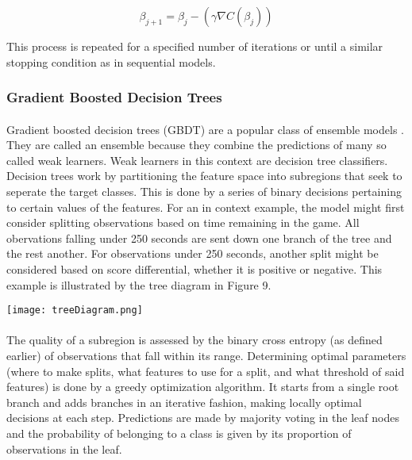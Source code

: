 \documentclass[11pt]{article}
\newenvironment{Figure}
  {\par\medskip\noindent\minipage{\linewidth}}
  {\endminipage\par\medskip}
\begin{document}
\begin{multicols*}{2}
                    $$\beta_{j+1} = \beta_j - (\gamma \nabla C(\beta_j))$$

                    This process is repeated for a specified number of iterations or until a similar stopping condition as in sequential models. 

            \subsubsection*{Gradient Boosted Decision Trees}
                \paragraph{}
                    Gradient boosted decision trees (GBDT) are a popular class of ensemble models \cite{Hastie01}. 
                    They are called an ensemble because they combine the predictions of many so called weak learners. 
                    Weak learners in this context are decision tree classifiers. 
                    Decision trees work by partitioning the feature space into subregions that seek to seperate the target classes.
                    This is done by a series of binary decisions pertaining to certain values of the features. 
                    For an in context example, the model might first consider splitting observations based on time remaining in the game. 
                    All obervations falling under 250 seconds are sent down one branch of the tree and the rest another. 
                    For observations under 250 seconds, another split might be considered based on score differential, whether it is positive or negative.
                    This example is illustrated by the tree diagram in Figure 9.
                    
                    \begin{Figure}  
                        \centering
                        \texttt{[image: treeDiagram.png]}
                        \label{fig:Simple Tree}
                    \end{Figure}

                    
                \paragraph{}
                    The quality of a subregion is assessed by the binary cross entropy (as defined earlier) of observations that fall within its range. 
                    Determining optimal parameters (where to make splits, what features to use for a split, and what threshold of said features) is done by a greedy optimization algorithm.
                    It starts from a single root branch and adds branches in an iterative fashion, making locally optimal decisions at each step. 
                    Predictions are made by majority voting in the leaf nodes and the probability of belonging to a class is given by its proportion of observations in the leaf. 
                    

\end{multicols*}
\end{document}
